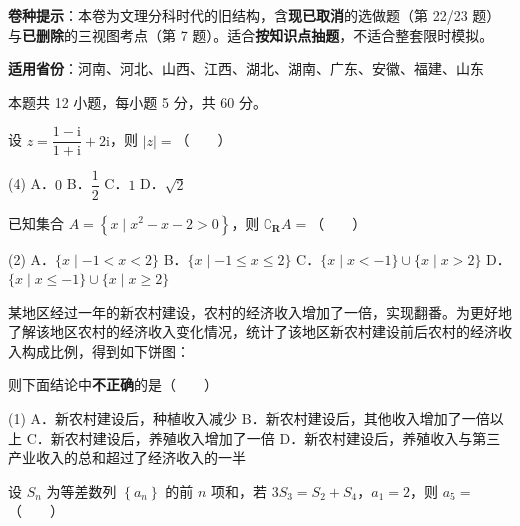 

\begin{gknotice}
\textbf{ 卷种提示}：本卷为文理分科时代的旧结构，含\textbf{现已取消}的选做题（第 22/23 题）与\textbf{已删除}的三视图考点（第 7 题）。适合\textbf{按知识点抽题}，不适合整套限时模拟。

\textbf{适用省份}：河南、河北、山西、江西、湖北、湖南、广东、安徽、福建、山东
\end{gknotice}

\par\medskip


\begin{gktip}
本题共 12 小题，每小题 5 分，共 60 分。
\end{gktip}

设 $z=\dfrac{1-\mathrm i}{1+\mathrm i}+2\mathrm i$，则 $|z|=$（　　）

\begin{gkopts}(4)
\task A．$0$
\task B．$\dfrac12$
\task C．$1$
\task D．$\sqrt2$
\end{gkopts}

已知集合 $A=\left\{x\mid x^{2}-x-2>0\right\}$，则 $\complement_{\mathbf R}A=$（　　）

\begin{gkopts}(2)
\task A．$\{x\mid-1<x<2\}$
\task B．$\{x\mid-1\le x\le2\}$
\task C．$\{x\mid x<-1\}\cup\{x\mid x>2\}$
\task D．$\{x\mid x\le-1\}\cup\{x\mid x\ge2\}$
\end{gkopts}

某地区经过一年的新农村建设，农村的经济收入增加了一倍，实现翻番。为更好地了解该地区农村的经济收入变化情况，统计了该地区新农村建设前后农村的经济收入构成比例，得到如下饼图：

\begin{center}\end{center}

则下面结论中\textbf{不正确}的是（　　）

\begin{gkopts}(1)
\task A．新农村建设后，种植收入减少
\task B．新农村建设后，其他收入增加了一倍以上
\task C．新农村建设后，养殖收入增加了一倍
\task D．新农村建设后，养殖收入与第三产业收入的总和超过了经济收入的一半
\end{gkopts}

设 $S_n$ 为等差数列 $\left\{a_n\right\}$ 的前 $n$ 项和，若 $3S_3=S_2+S_4$，$a_1=2$，则 $a_5=$（　　）

